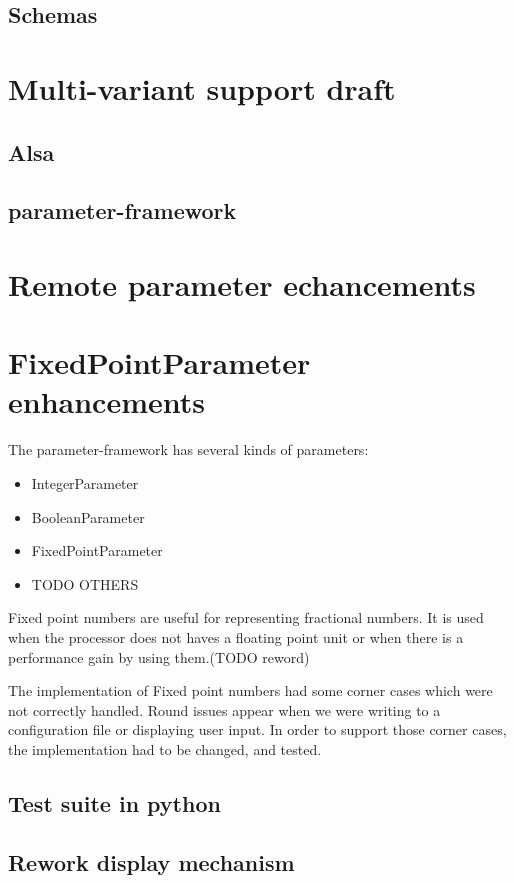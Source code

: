\subsection{Schemas}

\section{Multi-variant support draft}
\subsection{Alsa}
\subsection{parameter-framework}

\section{Remote parameter echancements}

\section{FixedPointParameter enhancements}
The parameter-framework has several kinds of parameters:
\begin{itemize}
    \item IntegerParameter
    \item BooleanParameter
    \item FixedPointParameter
    \item TODO OTHERS
\end{itemize}

Fixed point numbers are useful for representing fractional numbers. It is used
when the processor does not haves a floating point unit or when there is a
performance gain by using them.(TODO reword)

The implementation of Fixed point numbers had some corner cases which were not
correctly handled. Round issues appear when we were writing to a configuration
file or displaying user input. In order to support those corner cases, the
implementation had to be changed, and tested.
\subsection{Test suite in python}
\subsection{Rework display mechanism}

